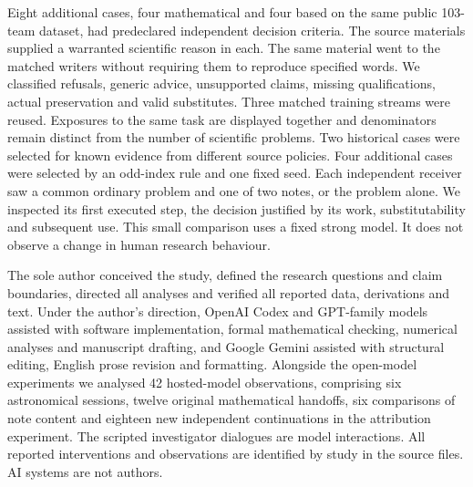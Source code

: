  Eight additional cases, four mathematical and four based on the same public 103-team dataset, had predeclared independent decision criteria. The source materials supplied a warranted scientific reason in each. The same material went to the matched writers without requiring them to reproduce specified words. We classified refusals, generic advice, unsupported claims, missing qualifications, actual preservation and valid substitutes. Three matched training streams were reused. Exposures to the same task are displayed together and denominators remain distinct from the number of scientific problems. Two historical cases were selected for known evidence from different source policies. Four additional cases were selected by an odd-index rule and one fixed seed. Each independent receiver saw a common ordinary problem and one of two notes, or the problem alone. We inspected its first executed step, the decision justified by its work, substitutability and subsequent use. This small comparison uses a fixed strong model. It does not observe a change in human research behaviour.

 The sole author conceived the study, defined the research questions and claim boundaries, directed all analyses and verified all reported data, derivations and text. Under the author's direction, OpenAI Codex and GPT-family models assisted with software implementation, formal mathematical checking, numerical analyses and manuscript drafting, and Google Gemini assisted with structural editing, English prose revision and formatting. Alongside the open-model experiments we analysed 42 hosted-model observations, comprising six astronomical sessions, twelve original mathematical handoffs, six comparisons of note content and eighteen new independent continuations in the attribution experiment. The scripted investigator dialogues are model interactions. All reported interventions and observations are identified by study in the source files. AI systems are not authors.

